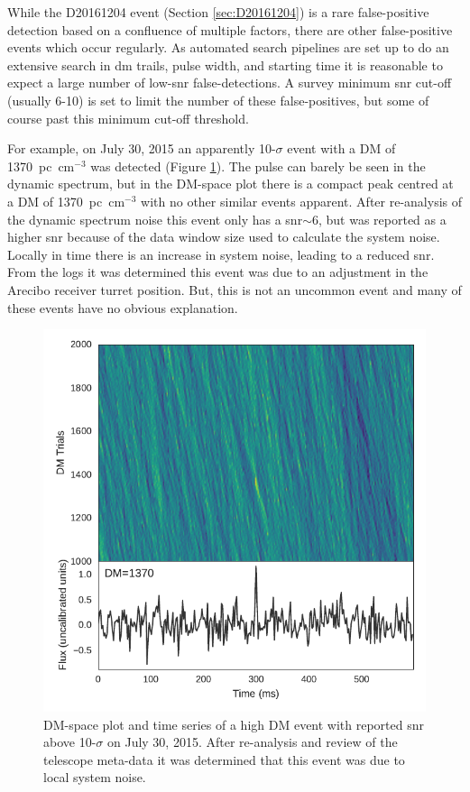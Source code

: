 \documentclass[a4paper,fleqn,usenatbib]{mnras}
\begin{document}
While the D20161204 event (Section \ref{sec:D20161204}) is a rare
false-positive detection based on a confluence of multiple factors, there are
other false-positive events which occur regularly.  As automated search
pipelines are set up to do an extensive search in \gls{dm} trails, pulse width,
and starting time it is reasonable to expect a large number of low-\gls{snr}
false-detections. A survey minimum \gls{snr} cut-off (usually 6-10) is set to
limit the number of these false-positives, but some of course past this minimum
cut-off threshold.

For example, on July 30, 2015 an apparently 10-$\sigma$ event with a DM of
1370~pc~cm$^{-3}$ was detected (Figure \ref{fig:D20150730}). The pulse can
barely be seen in the dynamic spectrum, but in the DM-space plot there is a
compact peak centred at a DM of 1370~pc~cm$^{-3}$ with no other similar events
apparent.  After re-analysis of the dynamic spectrum noise this event only has a
\gls{snr}$\sim$6, but was reported as a higher \gls{snr} because of the data
window size used to calculate the system noise.  Locally in time there is an
increase in system noise, leading to a reduced \gls{snr}.  From the logs it was
determined this event was due to an adjustment in the Arecibo receiver turret
position. But, this is not an uncommon event and many of these events have no
obvious explanation.

\begin{figure}
    \includegraphics[width=1.0\linewidth]{figures/D20150730_buf23_Beam6_dmtrial.pdf}
    \caption{DM-space plot and time series of a high DM event with reported
    \gls{snr} above 10-$\sigma$ on July 30, 2015. After re-analysis and review
    of the telescope meta-data it was determined that this event was due to
    local system noise.
    }
    \label{fig:D20150730}
\end{figure}
\end{document}
